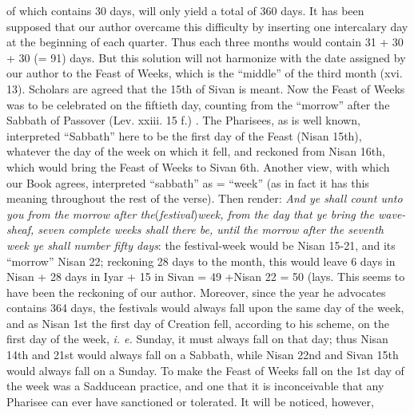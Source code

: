 of which contains 30 days, will only yield a total of 360 days. It has been supposed that our author overcame this difficulty by inserting one intercalary day at the beginning of each quarter. Thus each three months would contain 31 + 30 + 30 (= 91) days. But this solution will not harmonize with the date assigned by our author to the Feast of Weeks, which is the ``middle'' of the third month (xvi. 13). Scholars are agreed that the 15th of Sivan is meant. Now the Feast of Weeks was to be celebrated on the fiftieth day, counting from the ``morrow'' after the Sabbath of Passover (Lev. xxiii. 15 f.) . The Pharisees, as is well known, interpreted ``Sabbath'' here to be the first day of the Feast (Nisan 15th), whatever the day of the week on which it fell, and reckoned from Nisan 16th, which would bring the Feast of Weeks to Sivan 6th. Another view, with which our Book agrees, interpreted ``sabbath'' as = ``week'' (as in fact it has this meaning throughout the rest of the verse). Then render: \emph{And ye shall count unto you from the morrow after the}(\emph{festival})\emph{week, from the day that ye bring the wave-sheaf, seven complete weeks shall there be, until the morrow after the seventh week ye shall number fifty days}: the festival-week would be Nisan 15-21, and its ``morrow'' Nisan 22; reckoning 28 days to the month, this would leave 6 days in Nisan + 28 days in Iyar + 15 in Sivan = 49 +Nisan 22 = 50 (lays. This seems to have been the reckoning of our author. Moreover, since the year he advocates contains 364 days, the festivals would always fall upon the same day of the week, and as Nisan 1st the first day of Creation fell, according to his scheme, on the first day of the week, \emph{i. e.} Sunday, it must always fall on that day; thus Nisan 14th and 21st would always fall on a Sabbath, while Nisan 22nd and Sivan 15th would always fall on a Sunday. To make the Feast of Weeks fall on the 1st day of the week was a Sadducean practice, and one that it is inconceivable that any Pharisee can ever have sanctioned or tolerated. It will be noticed, however,

